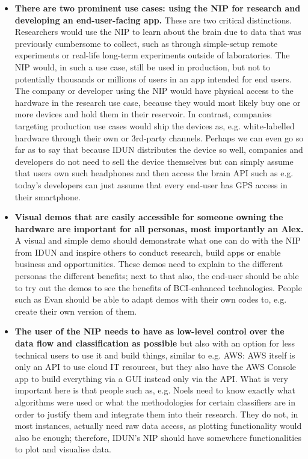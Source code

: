 \begin{itemize}
  \item \textbf{There are two prominent use cases: using the NIP for research and developing an end-user-facing app.} These are two critical distinctions. Researchers would use the NIP to learn about the brain due to data that was previously cumbersome to collect, such as through simple-setup remote experiments or real-life long-term experiments outside of laboratories. The NIP would, in such a use case, still be used in production, but not to potentially thousands or millions of users in an app intended for end users. The company or developer using the NIP would have physical access to the hardware in the research use case, because they would most likely buy one or more devices and hold them in their reservoir. In contrast, companies targeting production use cases would ship the devices as, e.g. white-labelled hardware through their own or 3rd-party channels. Perhaps we can even go so far as to say that because IDUN distributes the device so well, companies and developers do not need to sell the device themselves but can simply assume that users own such headphones and then access the brain API such as e.g. today's developers can just assume that every end-user has GPS access in their smartphone.
  \item \textbf{Visual demos that are easily accessible for someone owning the hardware are important for all personas, most importantly an Alex.} A visual and simple demo should demonstrate what one can do with the NIP from IDUN and inspire others to conduct research, build apps or enable business and opportunities. These demos need to explain to the different personas the different benefits; next to that also, the end-user should be able to try out the demos to see the benefits of BCI-enhanced technologies. People such as Evan should be able to adapt demos with their own codes to, e.g. create their own version of them.
  \item \textbf{The user of the NIP needs to have as low-level control over the data flow and classification as possible} but also with an option for less technical users to use it and build things, similar to e.g. AWS: AWS itself is only an API to use cloud IT resources, but they also have the AWS Console app to build everything via a GUI instead only via the API. What is very important here is that people such as, e.g. Noels need to know exactly what algorithms were used or what the methodologies for certain classifiers are in order to justify them and integrate them into their research. They do not, in most instances, actually need raw data access, as plotting functionality would also be enough; therefore, IDUN's NIP should have somewhere functionalities to plot and visualise data.

\end{itemize}
